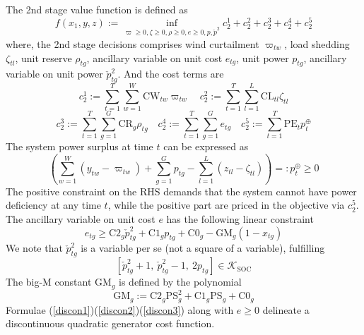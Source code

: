 The 2nd stage value function is defined as
\begin{equation}
    f(x_1, y, z) := \underset{\varpi \geqslant 0, \zeta \geqslant 0, \rho \geqslant 0, e \geqslant 0, p, \check{p}^2}{\inf} c_2^1 + c_2^2 + c_2^3 + c_2^4 + c_2^5
\end{equation}
where, the 2nd stage decisions comprises wind curtailment $\varpi_{tw}$, load shedding $\zeta_{tl}$, unit reserve $\rho_{tg}$, ancillary variable on unit cost $e_{tg}$, unit power $p_{tg}$, ancillary variable on unit power $\check{p}^2_{tg}$.
And the cost terms are
\begin{equation*}
    c_2^1 := \sum_{t = 1}^{T} \sum_{w = 1}^{W} \textrm{CW}_{tw} \varpi_{tw} \quad c_2^2 := \sum_{t = 1}^{T} \sum_{l = 1}^{L} \textrm{CL}_{tl} \zeta_{tl}
\end{equation*}
\begin{equation*}
    c_2^3 := \sum_{t = 1}^{T} \sum_{g = 1}^{G} \textrm{CR}_g \rho_{tg} \quad c_2^4 := \sum_{t = 1}^{T} \sum_{g = 1}^{G} e_{tg} \quad c_2^5 := \sum_{t = 1}^{T} \textrm{PE}_t p^\oplus_t
\end{equation*}
The system power surplus at time $t$ can be expressed as
\begin{equation}
    \left(\sum_{w = 1}^{W} (y_{tw} - \varpi_{tw}) + \sum_{g = 1}^{G} p_{tg} - \sum_{l = 1}^{L} (z_{tl} - \zeta_{tl})\right) =: p^\oplus_t \ge 0
\end{equation}
The positive constraint on the RHS demands that the system cannot have power deficiency at any time $t$, while the positive part are priced in the objective via $c_2^5$.
The ancillary variable on unit cost $e$ has the following linear constraint
\begin{equation}\label{discon1}
    e_{tg} \ge \textrm{C2}_g \check{p}^2_{tg} + \textrm{C1}_g p_{tg} + \textrm{C0}_g - \textrm{GM}_g (1 - x_{tg})
\end{equation}
We note that $\check{p}^2_{tg}$ is a variable per se (not a square of a variable), fulfilling
\begin{equation}\label{discon2}
    [\check{p}^2_{tg} + 1, \ \check{p}^2_{tg} - 1, \ 2 p_{tg}] \in \mathcal{K}_\textrm{SOC}
\end{equation}
The big-M constant $\textrm{GM}_g$ is defined by the polynomial
\begin{equation}\label{discon3}
    \textrm{GM}_g := \textrm{C2}_g \textrm{PS}_g^2 + \textrm{C1}_g \textrm{PS}_g + \textrm{C0}_g
\end{equation}
Formulae (\ref{discon1})(\ref{discon2})(\ref{discon3}) along with $e \geqslant 0$ delineate a discontinuous quadratic generator cost function.

